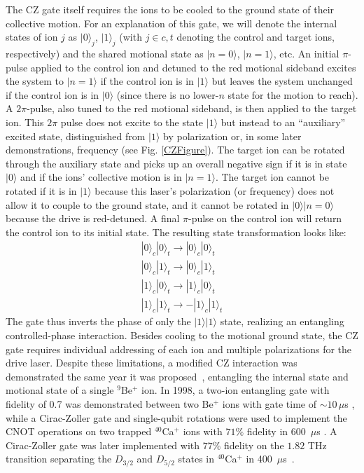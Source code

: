 \documentclass[%
reprint,
 amsmath,amssymb,
]{revtex4-1}
\newcommand{\zero}{|0 \rangle}
\newcommand{\one}{|1 \rangle}
\begin{document}
The CZ gate itself requires the ions to be cooled to the ground state of their collective motion. For an explanation of this gate, we will denote the internal states of ion $j$ as $\zero_j$, $\one_j$ (with $j \in c,t$ denoting the control and target ions, respectively) and the shared motional state as $| n = 0 \rangle$, $| n = 1 \rangle$, etc. An initial $\pi$-pulse applied to the control ion and detuned to the red motional sideband excites the system to $|n = 1 \rangle$ if the control ion is in $\one$ but leaves the system unchanged if the control ion is in $\zero$ (since there is no lower-$n$ state for the motion to reach). A $2 \pi$-pulse, also tuned to the red motional sideband, is then applied to the target ion. This $2 \pi$ pulse does not excite to the state $\one$ but instead to an ``auxiliary'' excited state, distinguished from $\one$ by polarization or, in some later demonstrations, frequency (see Fig. \ref{CZFigure}). The target ion can be rotated through the auxiliary state and picks up an overall negative sign if it is in state $\zero$ and if the ions' collective motion is in $|n = 1 \rangle$. The target ion cannot be rotated if it is in $\one$ because this laser's polarization (or frequency) does not allow it to couple to the ground state, and it cannot be rotated in $\zero |n = 0 \rangle$ because the drive is red-detuned. A final $\pi$-pulse on the control ion will return the control ion to its initial state. The resulting state transformation looks like:
%
\begin{eqnarray}
\zero_c \zero_t \rightarrow \zero_c \zero_t \\
\zero_c \one_t \rightarrow \zero_c \one_t \\
\one_c \zero_t \rightarrow \one_c \zero_t \\
\one_c \one_t \rightarrow - \one_c \one_t
\end{eqnarray}
%
The gate thus inverts the phase of only the $\one \one$ state, realizing an entangling controlled-phase interaction. Besides cooling to the motional ground state, the CZ gate requires individual addressing of each ion and multiple polarizations for the drive laser. Despite these limitations, a modified CZ interaction was demonstrated the same year it was proposed~\cite{MonroeCNOT1995}, entangling the internal state and motional state of a single $^9$Be$^+$ ion. In 1998, a two-ion entangling gate with fidelity of 0.7 was demonstrated between two Be$^+$ ions with gate time of $\sim 10 \, \mu$s \cite{TurchetteEntanglement1998}, while a Cirac-Zoller gate and single-qubit rotations were used to implement the CNOT operations on two trapped $^{40}$Ca$^+$ ions with $71 \%$ fidelity in $600$~$\mu$s \cite{SchmidtKalerCNOT2003}. A Cirac-Zoller gate was later implemented with $77 \%$ fidelity on the $1.82$ THz transition separating the $D_{3/2}$ and $D_{5/2}$ states in $^{40}$Ca$^+$ in 400~$\mu$s~\cite{PhysRevA.81.032322}.
\end{document}
